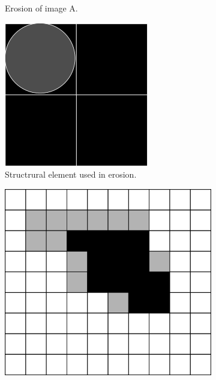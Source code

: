 \documentclass[
  digital,     %
  oneside,     %
  nosansbold,  %
  nocolorbold, %
  lof,         %
  lot,         %
]{fithesis4}
\begin{document}
\begin{figure}
\begin{subfigure}[t]{0.4\textwidth}
        \caption{Erosion of image A.}
        \label{fig:opening_erosion}
    \end{subfigure}
    \begin{subfigure}[t]{0.2\textwidth}
        \centering
        \includegraphics[width=\textwidth]{resources/inkscape/opening_erosion_se.png}
        \caption{Structrural element used in erosion.}
        \label{fig:opening_erosion_se}
    \end{subfigure}
    \begin{subfigure}[t]{0.4\textwidth}
        \centering
        \includegraphics[width=\textwidth]{resources/inkscape/opening_dilation.png}

\end{subfigure}
\end{figure}
\end{document}
